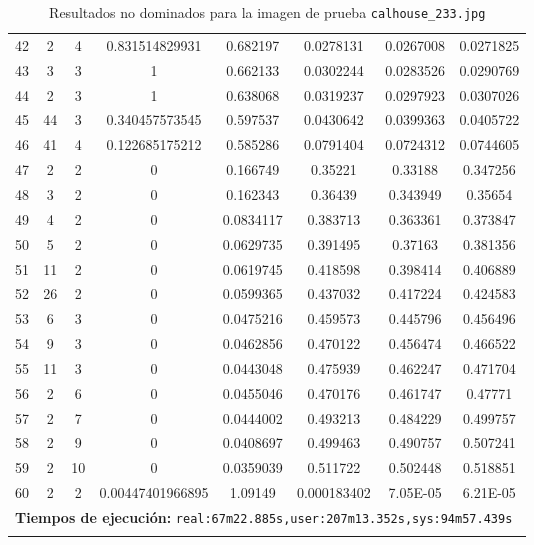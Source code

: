 \begin{longtable}{|c|c|c|c|c|c|c|c|}
42 & 2 & 4 & 0.831514829931 & 0.682197 & 0.0278131 & 0.0267008 & 0.0271825 \\
43 & 3 & 3 & 1 & 0.662133 & 0.0302244 & 0.0283526 & 0.0290769 \\
44 & 2 & 3 & 1 & 0.638068 & 0.0319237 & 0.0297923 & 0.0307026 \\
45 & 44 & 3 & 0.340457573545 & 0.597537 & 0.0430642 & 0.0399363 & 0.0405722 \\
46 & 41 & 4 & 0.122685175212 & 0.585286 & 0.0791404 & 0.0724312 & 0.0744605 \\
47 & 2 & 2 & 0 & 0.166749 & 0.35221 & 0.33188 & 0.347256 \\
48 & 3 & 2 & 0 & 0.162343 & 0.36439 & 0.343949 & 0.35654 \\
49 & 4 & 2 & 0 & 0.0834117 & 0.383713 & 0.363361 & 0.373847 \\
50 & 5 & 2 & 0 & 0.0629735 & 0.391495 & 0.37163 & 0.381356 \\
51 & 11 & 2 & 0 & 0.0619745 & 0.418598 & 0.398414 & 0.406889 \\
52 & 26 & 2 & 0 & 0.0599365 & 0.437032 & 0.417224 & 0.424583 \\
53 & 6 & 3 & 0 & 0.0475216 & 0.459573 & 0.445796 & 0.456496 \\
54 & 9 & 3 & 0 & 0.0462856 & 0.470122 & 0.456474 & 0.466522 \\
55 & 11 & 3 & 0 & 0.0443048 & 0.475939 & 0.462247 & 0.471704 \\
56 & 2 & 6 & 0 & 0.0455046 & 0.470176 & 0.461747 & 0.47771 \\
57 & 2 & 7 & 0 & 0.0444002 & 0.493213 & 0.484229 & 0.499757 \\
58 & 2 & 9 & 0 & 0.0408697 & 0.499463 & 0.490757 & 0.507241 \\
59 & 2 & 10 & 0 & 0.0359039 & 0.511722 & 0.502448 & 0.518851 \\
60 & 2 & 2 & 0.00447401966895 & 1.09149 & 0.000183402 & 7.05E-05 & 6.21E-05 \\
\hline
\multicolumn{8}{|c|}{\textbf{Tiempos de ejecución:} \texttt{real:67m22.885s,user:207m13.352s,sys:94m57.439s
}}\\  \hline
\caption{Resultados no dominados para la imagen de prueba \texttt{calhouse\_233.jpg}}
\label{tab:calhouse_233}
\end{longtable}
\normalsize

